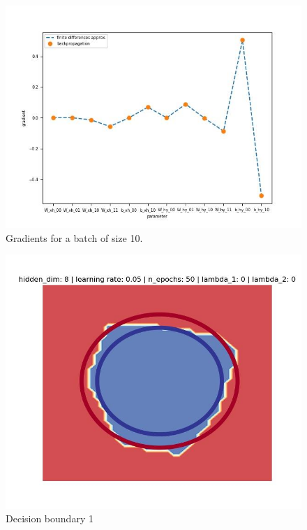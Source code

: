 \documentclass[11pt,english]{article}
\begin{document}
\begin{figure}
	\includegraphics[width=\linewidth]{pic4.jpg}
	\caption{Gradients for a batch of size 10.}
	\label{fig:boat1}
\end{figure}



\begin{figure}
	\includegraphics[width=\linewidth]{decision1.jpg}
	\caption{Decision boundary 1}
	\label{fig:boat1}
\end{figure}
\end{document}
